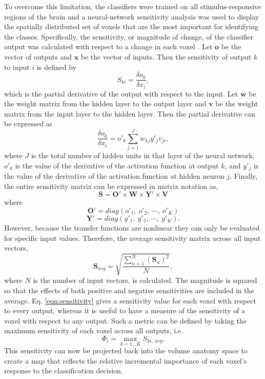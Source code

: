 \documentclass[review,1p,authoryear]{elsarticle}
\begin{document}
To overcome this limitation, the classifiers were trained on all stimulus-responsive regions of the brain and a neural-network sensitivity analysis was used to display the spatially distributed set of voxels that are the most important for identifying the classes.
Specifically, the sensitivity, or magnitude of change, of the classifier output was calculated with respect to a change in each voxel
 \citep{Zurada1994}.
Let $\mathbf{o}$ be the vector of outputs and $\mathbf{x}$ be the vector of inputs.
Then the sensitivity of output $k$ to input $i$ is defined by
\begin{equation}
S_{ki} = \frac{\delta o_{k}}{\delta x_{i}},
\end{equation}
which is the partial derivative of the output with respect to the input.
Let $\mathbf{w}$ be the weight matrix from the hidden layer to the output layer and $\mathbf{v}$ be the weight matrix from the input layer to the hidden layer.
Then the partial derivative can be expressed as
\begin{equation}
\frac{\delta o_{k}}{\delta x_{i}} = o'_{k} \sum^{J}_{j=1}{w_{kj}y'_{j}v_{ji}},
\end{equation}
where $J$ is the total number of hidden units in that layer of the neural network,  $o'_{k}$ is the value of the derivative of the activation function at output $k$, and $y'_{j}$ is the value of the derivative of the activation function at hidden neuron $j$.
Finally, the entire sensitivity matrix can be expressed in matrix notation as,
\begin{equation}
\mathbf{S} = \mathbf{O}' \times \mathbf{W} \times \mathbf{Y}' \times \mathbf{V}
\end{equation}
where
\begin{equation}
\mathbf{O}' = diag(o'_{1},~o'_{2},~\cdots,~o'_{K})
\end{equation}
\begin{equation}
\mathbf{Y}' = diag(y'_{1},~y'_{2},~\cdots,~y'_{K}).
\end{equation}
However, because the transfer functions are nonlinear they can only be evaluated for specific input values.
Therefore, the average sensitivity matrix across all input vectors,
\begin{equation}
\mathbf{S}_{avg} = \sqrt{ \frac{ \sum_{n = 1}^{N}{ \left( \mathbf{S}_{n}\right)^{2} } }{N} },
\label{eqn:sensitivity}
\end{equation}
where $N$ is the number of input vectors, is calculated.
The magnitude is squared so that the effects of both positive and negative sensitivities are included in the average.
Eq. \ref{eqn:sensitivity} gives a sensitivity value for each voxel with respect to every output, whereas it is useful to have a measure of the sensitivity of a voxel with respect to any output.
Such a metric can be defined by taking the maximum sensitivity of each voxel across all outputs, i.e.
\begin{equation}
\Phi_{i} = \max_{k=1 \dots K}{S_{ki,~avg}}.
\end{equation}
This sensitivity can now be projected back into the volume anatomy space to create a  map that reflects the relative incremental importance of each voxel's response to the classification decision.
\end{document}
